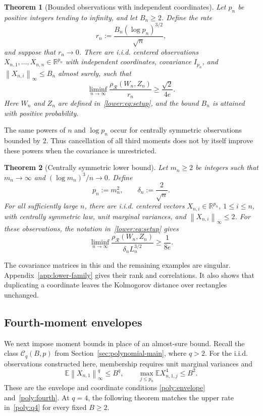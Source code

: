 \documentclass[11pt,letterpaper]{article}
\newtheorem{theorem}{Theorem}
\theoremstyle{remark}
\newcommand{\E}{\mathbb E}
\newcommand{\R}{\mathbb R}
\newcommand{\norm}[1]{\left\lVert#1\right\rVert}
\newcommand{\rh}{\rho_{\mathcal R}}
\begin{document}
\begin{theorem}[Bounded observations with independent coordinates]\label{opt:skew-lower}
Let \(p_n\) be positive integers tending to infinity, and let
\(B_n\ge2\). Define the rate
\[
 r_n:=\frac{B_n(\log p_n)^{3/2}}{\sqrt n},
\]
and suppose that \(r_n\to0\).
There are i.i.d. centered observations
\(X_{n,1},\ldots,X_{n,n}\in\R^{p_n}\) with independent coordinates,
covariance \(I_{p_n}\), and
\(\norm{X_{n,i}}_\infty\le B_n\) almost surely, such that
\begin{equation}
 \liminf_{n\to\infty}\frac{\rh(W_n,Z_n)}{r_n}
 \ge\frac{\sqrt2}{4e}.
 \label{opt:lower-constant}
\end{equation}
Here \(W_n\) and \(Z_n\) are defined in~\eqref{lower:eq:setup},
and the bound \(B_n\) is attained with positive probability.
\end{theorem}

The same powers of \(n\) and \(\log p_n\) occur for centrally
symmetric observations bounded by \(2\). Thus cancellation of all
third moments does not by itself improve these powers when the
covariance is unrestricted.

\begin{theorem}[Centrally symmetric lower bound]\label{opt:symmetric-lower}
Let \(m_n\ge2\) be integers such that \(m_n\to\infty\) and
\((\log m_n)^3/n\to0\). {Define}
\[
 p_n:=m_n^2,\qquad \delta_n:=\frac2{\sqrt n}.
\]
For all sufficiently large \(n\), there are i.i.d. centered vectors
\(X_{n,i}\in\R^{p_n}\), \(1\le i\le n\), with centrally symmetric
law, unit marginal variances, and \(\norm{X_{n,i}}_\infty\le2\).
For these observations, the notation in~\eqref{lower:eq:setup} gives
\[
 \liminf_{n\to\infty}
 \frac{\rh(W_n,Z_n)}{\delta_nL_n^{3/2}}\ge\frac1{8e}.
\]
\end{theorem}

The covariance matrices in this and the remaining examples are
singular. Appendix~\ref{app:lower-family} gives their rank and
correlations. It also shows that duplicating a coordinate leaves
the Kolmogorov distance over rectangles unchanged.

\subsection{Fourth-moment envelopes}\label{opt:q4-comparison}

We next impose moment bounds in place of an almost-sure bound.
Recall the class \(\mathcal C_q(B,p)\) from Section~\ref{sec:polynomial-main},
where \(q>2\). For the i.i.d. observations constructed here,
membership requires unit marginal variances and
\[
 \E\norm{X_{n,1}}_\infty^q\le B^q,\qquad
 \max_{j\le p_n}\E X_{n,1,j}^4\le B^2.
\]
These are the envelope and coordinate conditions
\eqref{poly:envelope} and~\eqref{poly:fourth}.
At \(q=4\), the following theorem matches the upper rate
in~\eqref{poly:q4} for every fixed \(B\ge2\).
\end{document}
